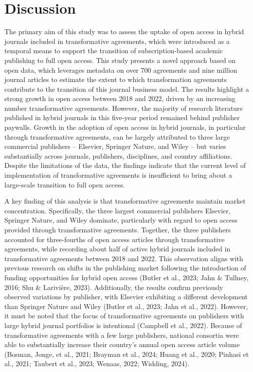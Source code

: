 \documentclass[a4paper,man,floatsintext,longtable,noextraspace,12pt]{apa6}
\begin{document}
\section{Discussion}\label{discussion}

The primary aim of this study was to assess the uptake of open access in
hybrid journals included in transformative agreements, which were
introduced as a temporal means to support the transition of
subscription-based academic publishing to full open access. This study
presents a novel approach based on open data, which leverages metadata
on over 700 agreements and nine million journal articles to estimate the
extent to which transformation agreements contribute to the transition
of this journal business model. The results highlight a strong growth in
open access between 2018 and 2022, driven by an increasing number
transformative agreements. However, the majority of research literature
published in hybrid journals in this five-year period remained behind
publisher paywalls. Growth in the adoption of open access in hybrid
journals, in particular through transformative agreements, can be
largely attributed to three large commercial publishers -- Elsevier,
Springer Nature, and Wiley -- but varies substantially across journals,
publishers, disciplines, and country affiliations. Despite the
limitations of the data, the findings indicate that the current level of
implementation of transformative agreements is insufficient to bring
about a large-scale transition to full open access.

A key finding of this analysis is that transformative agreements
maintain market concentration. Specifically, the three largest
commercial publishers Elsevier, Springer Nature, and Wiley dominate,
particularly with regard to open access provided through transformative
agreements. Together, the three publishers accounted for three-fourths
of open access articles through transformative agreements, while
recording about half of active hybrid journals included in
transformative agreements between 2018 and 2022. This observation aligns
with previous research on shifts in the publishing market following the
introduction of funding opportunities for hybrid open access (Butler et
al., 2023; Jahn \& Tullney, 2016; Shu \& Larivière, 2023). Additionally,
the results confirm previously observed variations by publisher, with
Elsevier exhibiting a different development than Springer Nature and
Wiley (Butler et al., 2023; Jahn et al., 2022). However, it must be
noted that the focus of transformative agreements on publishers with
large hybrid journal portfolios is intentional (Campbell et al., 2022).
Because of transformative agreements with a few large publishers,
national consortia were able to substantially increase their country's
annual open access article volume (Bosman, Jonge, et al., 2021; Brayman
et al., 2024; Huang et al., 2020; Pinhasi et al., 2021; Taubert et al.,
2023; Wenaas, 2022; Widding, 2024).
\end{document}

